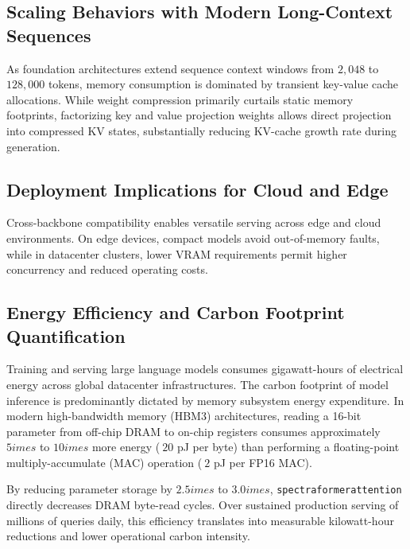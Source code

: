 \subsection{Scaling Behaviors with Modern Long-Context Sequences}
As foundation architectures extend sequence context windows from $2{,}048$ to $128{,}000$ tokens, memory consumption is dominated by transient key-value cache allocations. While weight compression primarily curtails static memory footprints, factorizing key and value projection weights allows direct projection into compressed KV states, substantially reducing KV-cache growth rate during generation.

\subsection{Deployment Implications for Cloud and Edge}
Cross-backbone compatibility enables versatile serving across edge and cloud environments. On edge devices, compact models avoid out-of-memory faults, while in datacenter clusters, lower VRAM requirements permit higher concurrency and reduced operating costs.

\subsection{Energy Efficiency and Carbon Footprint Quantification}
Training and serving large language models consumes gigawatt-hours of electrical energy across global datacenter infrastructures. The carbon footprint of model inference is predominantly dictated by memory subsystem energy expenditure. In modern high-bandwidth memory (HBM3) architectures, reading a 16-bit parameter from off-chip DRAM to on-chip registers consumes approximately $5	imes$ to $10	imes$ more energy ($~20$ pJ per byte) than performing a floating-point multiply-accumulate (MAC) operation ($~2$ pJ per FP16 MAC).

By reducing parameter storage by $2.5	imes$ to $3.0	imes$, \texttt{spectraformerattention} directly decreases DRAM byte-read cycles. Over sustained production serving of millions of queries daily, this efficiency translates into measurable kilowatt-hour reductions and lower operational carbon intensity.
